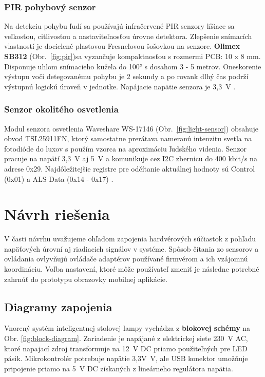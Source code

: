 \documentclass[12pt, a4paper]{article}
\begin{document}
\subsubsection{PIR pohybový senzor}
Na detekciu pohybu ľudí sa používajú infračervené PIR senzory líšiace sa veľkosťou, citlivosťou a nastaviteľnosťou úrovne detektora. Zlepšenie snímacích vlastností je docielené plastovou Fresnelovou šošovkou na senzore. \textbf{Olimex SB312} (Obr.~\ref{fig:pir})sa vyzančuje kompaktnosťou s rozmermi PCB: 10 x 8 mm. Disponuje uhlom snímacieho kužela do 100° s dosahom 3 - 5 metrov. Oneskorenie výstupu voči detegovanému pohybu je 2 sekundy a po rovank dlhý čas podrží výstupnú logickú úroveň v jednotke. Napájacie napätie senzora je 3,3~V \cite{olimex_pir-sb312_nodate}.

\subsubsection{Senzor okolitého osvetlenia}
Modul senzora osvetlenia Waveshare WS-17146 (Obr.~\ref{fig:light-sensor}) obsahuje obvod TSL25911FN, ktorý samostatne prerátava nameranú intenzitu svetla na fotodióde do luxov s použím vzorca na aproximáciu ľudského videnia. Senzor pracuje na napätí 3,3~V aj 5~V a komunikuje cez I2C zbernicu do 400 kbit/s na adrese 0x29. Najdôležitejšie registre pre odčítanie aktuálnej hodnoty sú Control (0x01) a ALS Data (0x14 - 0x17) \cite{noauthor_tsl25911_nodate}.

\section{Návrh riešenia}
V časti návrhu uvažujeme ohľadom zapojenia hardvérových súčiastok z pohľadu napäťových úrovní aj riadiacich signálov v systéme. Spôsob čítania zo sensorov a ovládania ovlyvňujú ovládače adaptérov používané firmvérom a ich vzájomnú koordináciu. Voľba nastavení, ktoré môže používateľ zmeniť je následne potrebné zahrnúť do prototypu obrazovky mobilnej aplikácie.

\subsection{Diagramy zapojenia}
Vnorený systém inteligentnej stolovej lampy vychádza z \textbf{blokovej schémy} na Obr. \ref{fig:block-diagram}. Zariadenie je napájané z elektrickej siete 230~V AC, ktoré napajací zdroj transformuje na 12~V DC priamo použiteľných pre LED pásik. Mikrokontrolér potrebuje napätie 3,3V~V, ale USB konektor umožňuje pripojenie priamo na 5~V DC získaných z lineárneho regulátora napätia.
\end{document}
